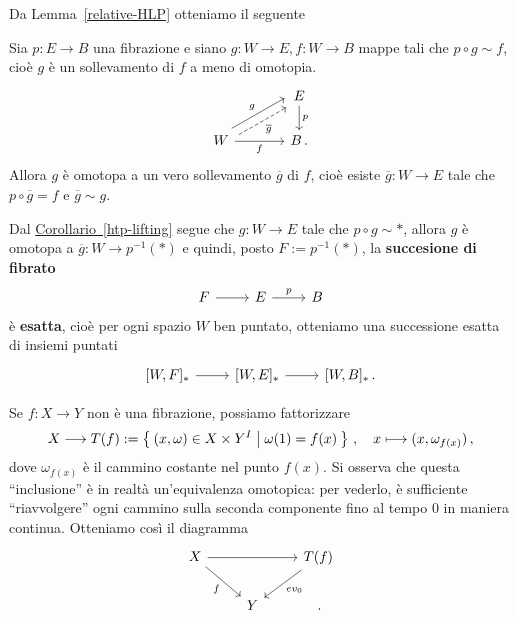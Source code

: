 Da Lemma~\ref{relative-HLP} otteniamo il seguente
\begin{cor}\label{htp-lifting}
	Sia $p:E \to B$ una fibrazione e siano
	$g:W \to E, f:W \to B$ mappe tali che $p \circ g \sim f$,
	cioè $g$ è un sollevamento di $f$ a meno di omotopia.
	\begin{equation*}
		\begin{tikzcd}[column sep=large]
			& E \ar[d, "p"] \\
			W \ar[r, "f"'] \ar[ru, "g", shift left=1ex] \ar[ru, "\overline{g}"', dashed, shift right=0.5ex, shorten=0.5ex]  & B\,.
		\end{tikzcd}
	\end{equation*}
	Allora $g$ è omotopa a un vero sollevamento $\overline{g}$ di $f$,
	cioè esiste $\overline{g}:W \to E$ tale che $p \circ \overline{g} = f$
	e $\overline{g} \sim g$.
\end{cor}

Dal \hyperref[htp-lifting]{Corollario~\ref{htp-lifting}} 
segue che $g:W \to E$ tale che $p \circ g \sim \ast$,
allora $g$ è omotopa a $\overline{g}: W \to p^{-1}(\ast)$
e quindi, posto $F:=p^{-1}(\ast)$, la \textbf{succesione di fibrato}
\begin{equation*}
	\begin{tikzcd}
		F \ar[r] & E \ar[r, "p"] & B
	\end{tikzcd}
\end{equation*}
è \textbf{esatta}, cioè per ogni spazio $W$ ben puntato,
otteniamo una successione esatta di insiemi puntati 
\begin{equation*}
	\begin{tikzcd}
		{[W,F]_{\ast}} \ar[r] & {[W,E]_{\ast}} \ar[r] & {[W,B]_{\ast}}\,.
	\end{tikzcd}
\end{equation*}


Se $f:X \to Y$ non è una fibrazione, 
possiamo fattorizzare
\begin{equation*}
	X \longrightarrow T(f) 
	:= \Set{(x,\omega) \in X \times Y^{I} | \omega(1) = f(x)}\,,
	\quad x \longmapsto (x, \omega_{f(x)})\,,
\end{equation*}
dove $\omega_{f(x)}$ è il cammino costante nel punto $f(x)$.
Si osserva che questa ``inclusione'' è in realtà 
un'equivalenza omotopica: per vederlo,
è sufficiente ``riavvolgere'' ogni cammino sulla seconda
componente fino al tempo $0$ in maniera continua.
Otteniamo così il diagramma
\begin{equation*}
	\begin{tikzcd}
		X \ar[rr] \ar[dr, "f"'] & & T(f) \ar[dl, "ev_{0}"] \\
		& Y & \,.
	\end{tikzcd}
\end{equation*}

